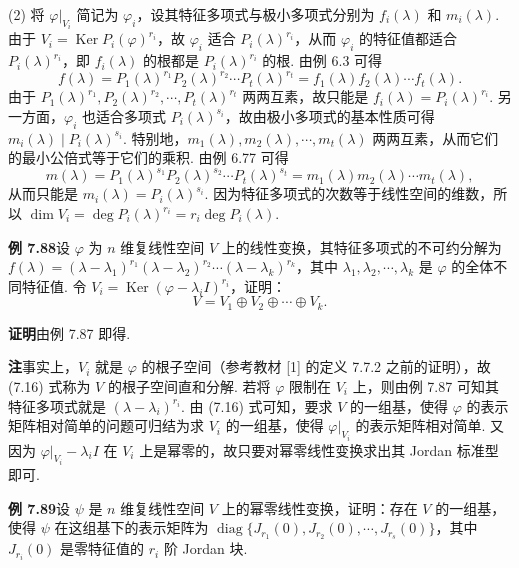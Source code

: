 \documentclass[UTF8,12pt,a4paper,fontset=fandol]{ctexart}
\begin{document}
(2) 将 $\varphi|_{V_i}$ 简记为 $\varphi_i$，设其特征多项式与极小多项式分别为 $f_i(\lambda)$ 和 $m_i(\lambda)$. 由于 $V_i=\operatorname{Ker}P_i(\varphi)^{r_i}$，故 $\varphi_i$ 适合 $P_i(\lambda)^{r_i}$，从而 $\varphi_i$ 的特征值都适合 $P_i(\lambda)^{r_i}$，即 $f_i(\lambda)$ 的根都是 $P_i(\lambda)^{r_i}$ 的根. 由例 6.3 可得
\[
f(\lambda)=P_1(\lambda)^{r_1}P_2(\lambda)^{r_2}\cdots P_t(\lambda)^{r_t}=f_1(\lambda)f_2(\lambda)\cdots f_t(\lambda).
\]
由于 $P_1(\lambda)^{r_1},P_2(\lambda)^{r_2},\cdots,P_t(\lambda)^{r_t}$ 两两互素，故只能是 $f_i(\lambda)=P_i(\lambda)^{r_i}$. 另一方面，$\varphi_i$ 也适合多项式 $P_i(\lambda)^{s_i}$，故由极小多项式的基本性质可得 $m_i(\lambda)\mid P_i(\lambda)^{s_i}$. 特别地，$m_1(\lambda),m_2(\lambda),\cdots,m_t(\lambda)$ 两两互素，从而它们的最小公倍式等于它们的乘积. 由例 6.77 可得
\[
m(\lambda)=P_1(\lambda)^{s_1}P_2(\lambda)^{s_2}\cdots P_t(\lambda)^{s_t}=m_1(\lambda)m_2(\lambda)\cdots m_t(\lambda),
\]
从而只能是 $m_i(\lambda)=P_i(\lambda)^{s_i}$. 因为特征多项式的次数等于线性空间的维数，所以 $\dim V_i=\deg P_i(\lambda)^{r_i}=r_i\deg P_i(\lambda)$.

\noindent\textbf{例 7.88}\quad 设 $\varphi$ 为 $n$ 维复线性空间 $V$ 上的线性变换，其特征多项式的不可约分解为 $f(\lambda)=(\lambda-\lambda_1)^{r_1}(\lambda-\lambda_2)^{r_2}\cdots(\lambda-\lambda_k)^{r_k}$，其中 $\lambda_1,\lambda_2,\cdots,\lambda_k$ 是 $\varphi$ 的全体不同特征值. 令 $V_i=\operatorname{Ker}(\varphi-\lambda_iI)^{r_i}$，证明：
\[
V=V_1\oplus V_2\oplus\cdots\oplus V_k.
\tag{7.16}
\]

\noindent\textbf{证明}\quad 由例 7.87 即得.

\noindent\textbf{注}\quad 事实上，$V_i$ 就是 $\varphi$ 的根子空间（参考教材 [1] 的定义 7.7.2 之前的证明），故 (7.16) 式称为 $V$ 的根子空间直和分解. 若将 $\varphi$ 限制在 $V_i$ 上，则由例 7.87 可知其特征多项式就是 $(\lambda-\lambda_i)^{r_i}$. 由 (7.16) 式可知，要求 $V$ 的一组基，使得 $\varphi$ 的表示矩阵相对简单的问题可归结为求 $V_i$ 的一组基，使得 $\varphi|_{V_i}$ 的表示矩阵相对简单. 又因为 $\varphi|_{V_i}-\lambda_iI$ 在 $V_i$ 上是幂零的，故只要对幂零线性变换求出其 Jordan 标准型即可.

\noindent\textbf{例 7.89}\quad 设 $\psi$ 是 $n$ 维复线性空间 $V$ 上的幂零线性变换，证明：存在 $V$ 的一组基，使得 $\psi$ 在这组基下的表示矩阵为 $\operatorname{diag}\{J_{r_1}(0),J_{r_2}(0),\cdots,J_{r_s}(0)\}$，其中 $J_{r_i}(0)$ 是零特征值的 $r_i$ 阶 Jordan 块.
\end{document}
